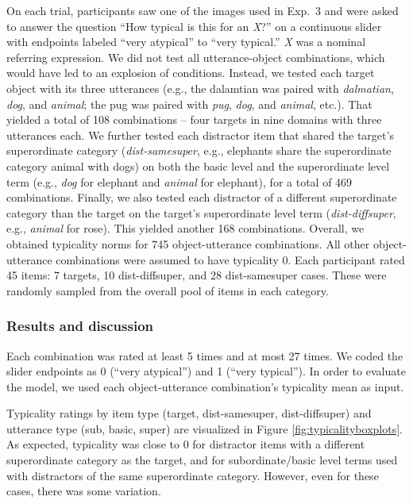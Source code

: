\documentclass[11pt]{article}
\newcommand{\figref}[1]{Figure \ref{#1}}
\begin{document}
On each trial, participants saw one of the images used in Exp.~3 and were asked to answer the question ``How typical is this for an \emph{X}?'' on a continuous slider with endpoints labeled ``very atypical'' to ``very typical.'' \emph{X} was a nominal referring expression. We did not test all utterance-object combinations, which would have led to an explosion of conditions. Instead, we tested each target object with its three utterances (e.g., the dalamtian was paired with \emph{dalmatian}, \emph{dog}, and \emph{animal}; the pug was paired with \emph{pug}, \emph{dog}, and \emph{animal}, etc.). That yielded a total of 108 combinations -- four targets in nine domains with three utterances each. We further tested each distractor item that shared the target's superordinate category (\emph{dist-samesuper}, e.g., elephants share the superordinate category animal with dogs) on both the basic level and the superordinate level term (e.g., \emph{dog} for elephant and \emph{animal} for elephant), for a total of 469 combinations. Finally, we also tested each distractor of a different superordinate category than the target on the target's superordinate level term (\emph{dist-diffsuper}, e.g., \emph{animal} for rose). This yielded another 168 combinations. Overall, we obtained typicality norms for 745 object-utterance combinations. All other object-utterance combinations were assumed to have typicality 0. Each participant rated 45 items: 7 targets, 10 dist-diffsuper, and 28 dist-samesuper cases. These were randomly sampled from the overall pool of items in each category. 

\subsubsection{Results and discussion}

Each combination was rated at least 5 times and at most 27 times. We coded the slider endpoints as 0 (``very atypical'') and 1 (``very typical''). In order to evaluate the model, we used each object-utterance combination's typicality mean as input. 

Typicality ratings by item type (target, dist-samesuper, dist-diffsuper) and utterance type (sub, basic, super) are visualized in \figref{fig:typicalityboxplots}. As expected, typicality was close to 0 for distractor items with a different superordinate category as the target, and for subordinate/basic level terms used with distractors of the same superordinate category. However, even for these cases, there was some variation. 
\end{document}
